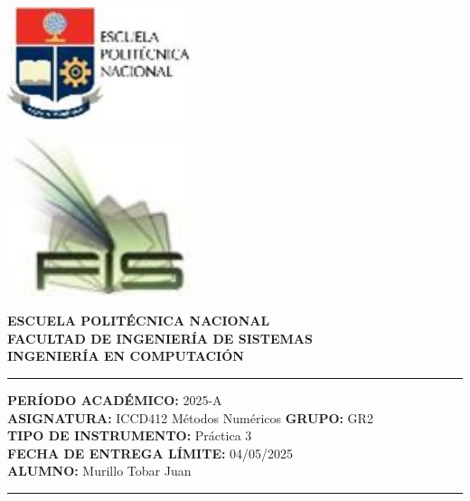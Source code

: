 \documentclass[12pt]{article}
\begin{document}
\begin{minipage}{0.45\textwidth}
    \includegraphics[width=0.4\textwidth]{inFiles/Figures/epnLogo.jpg}
\end{minipage}
\hfill
\begin{minipage}{0.45\textwidth}
    \raggedleft
    \includegraphics[width=0.4\textwidth]{inFiles/Figures/FIS_logo.jpg}
\end{minipage}

\vspace{0.5cm}

\begin{center}
    \textbf{ESCUELA POLITÉCNICA NACIONAL}\\[0.2cm]
    \textbf{FACULTAD DE INGENIERÍA DE SISTEMAS}\\[0.2cm]
    \textbf{INGENIERÍA {\textbf{EN COMPUTACIÓN}}}
\end{center}

\vspace{0.5cm}
\hrule
\vspace{0.5cm}

\noindent\textbf{PERÍODO ACADÉMICO:} 2025-A\\[0.2cm]
\noindent\textbf{ASIGNATURA:} ICCD412 Métodos Numéricos \hfill \textbf{GRUPO:} GR2\\[0.2cm]
\noindent\textbf{TIPO DE INSTRUMENTO:} Práctica 3\\[0.2cm]
\noindent\textbf{FECHA DE ENTREGA LÍMITE:} 04/05/2025\\[0.2cm]
\noindent\textbf{ALUMNO:} Murillo Tobar Juan

\vspace{0.5cm}
\hrule
\vspace{1cm}
\end{document}
